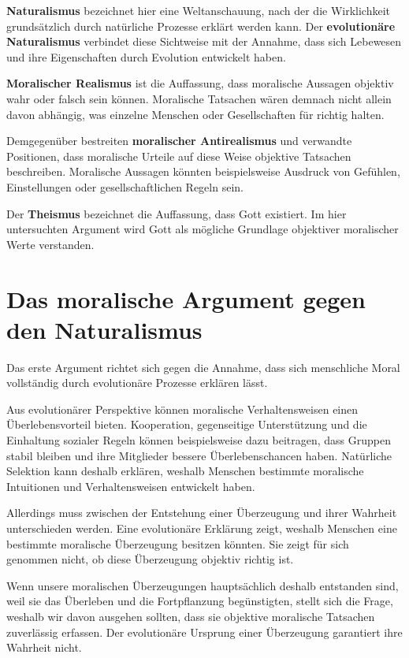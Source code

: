 \documentclass[11pt,a4paper]{article}
\begin{document}
	\textbf{Naturalismus} bezeichnet hier eine Weltanschauung, nach der die Wirklichkeit grundsätzlich durch natürliche Prozesse erklärt werden kann. Der \textbf{evolutionäre Naturalismus} verbindet diese Sichtweise mit der Annahme, dass sich Lebewesen und ihre Eigenschaften durch Evolution entwickelt haben.
	
	\textbf{Moralischer Realismus} ist die Auffassung, dass moralische Aussagen objektiv wahr oder falsch sein können. Moralische Tatsachen wären demnach nicht allein davon abhängig, was einzelne Menschen oder Gesellschaften für richtig halten.
	
	Demgegenüber bestreiten \textbf{moralischer Antirealismus} und verwandte Positionen, dass moralische Urteile auf diese Weise objektive Tatsachen beschreiben. Moralische Aussagen könnten beispielsweise Ausdruck von Gefühlen, Einstellungen oder gesellschaftlichen Regeln sein.
	
	Der \textbf{Theismus} bezeichnet die Auffassung, dass Gott existiert. Im hier untersuchten Argument wird Gott als mögliche Grundlage objektiver moralischer Werte verstanden.
	
	\section{Das moralische Argument gegen den Naturalismus}
	
	Das erste Argument richtet sich gegen die Annahme, dass sich menschliche Moral vollständig durch evolutionäre Prozesse erklären lässt.
	
	Aus evolutionärer Perspektive können moralische Verhaltensweisen einen Überlebensvorteil bieten. Kooperation, gegenseitige Unterstützung und die Einhaltung sozialer Regeln können beispielsweise dazu beitragen, dass Gruppen stabil bleiben und ihre Mitglieder bessere Überlebenschancen haben. Natürliche Selektion kann deshalb erklären, weshalb Menschen bestimmte moralische Intuitionen und Verhaltensweisen entwickelt haben.
	
	Allerdings muss zwischen der Entstehung einer Überzeugung und ihrer Wahrheit unterschieden werden. Eine evolutionäre Erklärung zeigt, weshalb Menschen eine bestimmte moralische Überzeugung besitzen könnten. Sie zeigt für sich genommen nicht, ob diese Überzeugung objektiv richtig ist.
	
	Wenn unsere moralischen Überzeugungen hauptsächlich deshalb entstanden sind, weil sie das Überleben und die Fortpflanzung begünstigten, stellt sich die Frage, weshalb wir davon ausgehen sollten, dass sie objektive moralische Tatsachen zuverlässig erfassen. Der evolutionäre Ursprung einer Überzeugung garantiert ihre Wahrheit nicht.
	
\end{document}
